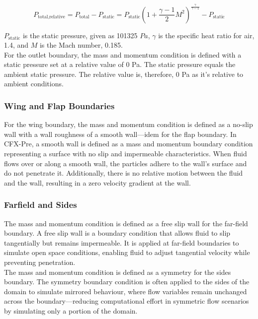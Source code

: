 \begin{equation}
    P_{\text{total,relative}} = P_{\text{total}} - P_{\text{static}} = P_{\text{static}} \left( 1 + \frac{\gamma - 1}{2} M^2 \right)^\frac{\gamma}{\gamma - 1} - P_{\text{static}}
\end{equation}

$P_{\text{static}}$ is the static pressure, given as 101325 $Pa$, $\gamma$ is the specific heat ratio for air, 1.4, and $M$ is the Mach number, 0.185.\\

For the outlet boundary, the mass and momentum condition is defined with a static pressure set at a relative value of 0 Pa. The static pressure equals the ambient static pressure. The relative value is, therefore, 0 Pa as it's relative to ambient conditions.

\subsubsection{Wing and Flap Boundaries}
For the wing boundary, the mass and momentum condition is defined as a no-slip wall with a wall roughness of a smooth wall—idem for the flap boundary.  In CFX-Pre, a smooth wall is defined as a mass and momentum boundary condition representing a surface with no slip and impermeable characteristics. When fluid flows over or along a smooth wall, the particles adhere to the wall's surface and do not penetrate it. Additionally, there is no relative motion between the fluid and the wall, resulting in a zero velocity gradient at the wall.


\subsubsection{Farfield and Sides}
The mass and momentum condition is defined as a free slip wall for the far-field boundary. A free slip wall is a boundary condition that allows fluid to slip tangentially but remains impermeable. It is applied at far-field boundaries to simulate open space conditions, enabling fluid to adjust tangential velocity while preventing penetration. \\

The mass and momentum condition is defined as a symmetry for the sides boundary. The symmetry boundary condition is often applied to the sides of the domain to simulate mirrored behaviour, where flow variables remain unchanged across the boundary—reducing computational effort in symmetric flow scenarios by simulating only a portion of the domain.



